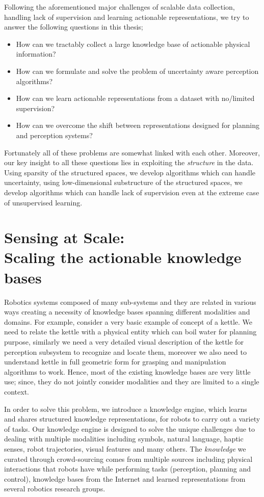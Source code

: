 Following the aforementioned major challenges of scalable data collection, handling lack of supervision and learning actionable representations, we try to answer the following questions in this thesis;
\begin{itemize}
\item How can we tractably collect a large knowledge base of actionable physical information?
\item How can we formulate and solve the problem of uncertainty aware perception algorithms?
\item How can we learn actionable representations from a dataset with no/limited supervision?
\item How can we overcome the shift between representations designed for planning and perception systems? 
\end{itemize}

Fortunately all of these problems are somewhat linked with each other. Moreover, our key insight to all these questions lies in exploiting the \emph{structure} in the data. Using sparsity of the structured spaces, we develop algorithms which can handle uncertainty, using low-dimensional substructure of the structured spaces, we develop algorithms which can handle lack of supervision even at the extreme case of unsupervised learning. 


\section{Sensing at Scale: \\ Scaling the actionable knowledge bases}
Robotics systems composed of many sub-systems and they are related in various ways creating a necessity of knowledge bases spanning different modalities and domains. For example, consider a very basic example of concept of a kettle. We need to relate the kettle with a physical entity which can boil water for planning purpose, similarly we need a very detailed visual description of the kettle for perception subsystem to recognize and locate them, moreover we also need to understand kettle in full geometric form for grasping and manipulation algorithms to work. Hence, most of the existing knowledge bases\cite{yago2007, ferrucci2012a, freebase2008} are very little use; since, they do not jointly consider modalities and they are limited to a single context.

In order to solve this problem, we introduce a knowledge engine, which learns and shares structured knowledge representations, for robots to carry out a variety of tasks. Our knowledge engine is designed to solve the unique challenges due to dealing with multiple modalities including symbols, natural language, haptic senses, robot trajectories, visual features and many others. The \textit{knowledge} we curated through crowd-sourcing comes from multiple sources including physical interactions that robots have while performing tasks (perception, planning and control), knowledge bases from the Internet and learned representations from several robotics research groups. 

